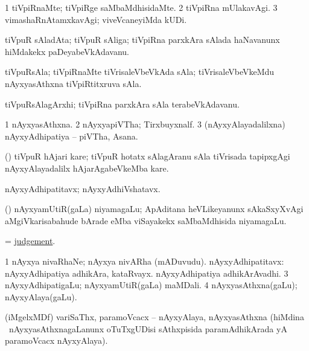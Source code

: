\bentry
{}
\gl{\kirxvi}
\bmng
\bnum
\num{1} tiVpiRnaMte; tiVpiRge saMbaMdhisidaMte. 
\num{2} tiVpiRna mUlakavAgi. 
\num{3} vimashaRnAtamxkavAgi; viveVcaneyiMda kUDi. 
\enum
\emng
\eentry

\bentry
{}
\gl{\nA}
\bmng
tiVpuR sAladAta; tiVpuR sAliga; tiVpiRna parxkAra sAlada haNavanunx hiMdakekx paDeyabeVkAdavanu. 
\emng
\eentry

\bentry
{}
\gl{\nA}
\bmng
tiVpuRsAla; tiVpiRnaMte tiVrisaleVbeVkAda sAla; tiVrisaleVbeVkeMdu nAyxyasAthxna tiVpiRtitxruva sAla. 
\emng
\eentry

\bentry
{}
\gl{\nA}
\bmng
tiVpuRsAlagArxhi; tiVpiRna parxkAra sAla terabeVkAdavanu. 
\emng
\eentry

\bentry
{}
\gl{\nA}
\bmng
\bnum
\num{1} nAyxyasAthxna. 
\num{2} nAyxyapiVTha; Tirxbuyxnalf. 
\num{3} (nAyxyAlayadalilxna) nAyxyAdhipatiya -- piVTha, Asana. 
\enum
\emng
\eentry

\bentry
{}
\gl{\nA}
\bmng
(\birx) tiVpuR hAjari kare; tiVpuR hotatx sAlagAranu sAla tiVrisada tapipxgAgi nAyxyAlayadalilx hAjarAgabeVkeMba kare. 
\emng
\eentry

\bentry
{}
\gl{\nA}
\bmng
nAyxyAdhipatitavx; nAyxyAdhiVshatavx. 
\emng
\eentry

\bentry
{}
\gl{\nA}
\bmng
(\birx) nAyxyamUtiR(gaLa) niyamagaLu; ApAditana heVLikeyanunx sAkaSxyXvAgi aMgiVkarisabahude bArade eMba viSayakekx saMbaMdhisida niyamagaLu. 
\emng
\eentry

\bentry
{}
\gl{\nA}
\bmng
= \hyperlink{judgement}{judgement}. 
\emng
\eentry

\bentry
{}
\gl{\nA}
\bmng
\bnum
\num{1} nAyxya nivaRhaNe; nAyxya nivARha (mADuvudu). 
 nAyxyAdhipatitavx: 
\banum
{} nAyxyAdhipatiya adhikAra, kataRvayx. 
 nAyxyAdhipatiya adhikArAvadhi. 
\eanum
\numie
\num{3} nAyxyAdhipatigaLu; nAyxyamUtiR(gaLa) maMDali. 
\num{4} nAyxyasAthxna(gaLu); nAyxyAlaya(gaLu). 
\enum
\emng

\noindent
\gl{\pagu}
\bmng
{} (iMgelxMDf) variSaThx, paramoVcacx -- nAyxyAlaya, nAyxyasAthxna (hiMdina  \mo\ nAyxyasAthxnagaLanunx oTuTxgUDisi sAthxpisida paramAdhikArada yA paramoVcacx nAyxyAlaya). 
\emng
\eentry

